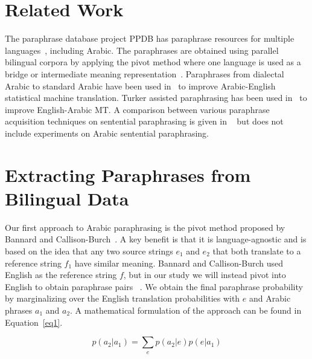 \documentclass[11pt,letterpaper]{article}
\begin{document}
\section{Related Work}
\label{related}
The paraphrase database project PPDB has paraphrase resources for multiple languages~\cite{bannard2005bilingual}, including Arabic. The paraphrases are obtained using parallel bilingual corpora  by applying the pivot method where one language is used as a bridge or intermediate meaning representation~\cite{bannard2005bilingual}. Paraphrases from dialectal Arabic to standard Arabic have been used in~\cite{Salloum:2011:DSA:2140533.2140535} to improve Arabic-English statistical machine translation. Turker assisted paraphrasing has been used in~\cite{turker} to improve English-Arabic MT. A comparison between various paraphrase acquisition techniques on sentential paraphrasing is given in ~\cite{Bouamor2010} but does not include experiments on Arabic sentential paraphrasing.

\section{Extracting Paraphrases from Bilingual Data}
\label{pb}
Our first approach to Arabic paraphrasing is the pivot method proposed by Bannard and Callison-Burch~\cite{bannard2005bilingual}. A key benefit is that it is language-agnostic and is based on the idea that any two source strings $e_1$ and $e_2$ that both translate to a reference string $f_1$ have similar meaning. Bannard and Callison-Burch used English as the reference string $f$, but in our study we will instead pivot into English to obtain paraphrase pairs~ \cite{bannard2005bilingual}. We obtain the final paraphrase probability by marginalizing over the English translation probabilities with $e$ and Arabic phrases $a_1$ and $a_2$. A mathematical formulation of the approach can be found in Equation~\ref{eq1}.

\begin{equation}
p(a_2 | a_1) = \sum_{e} p(a_2 | e) p(e | a_1)
\label{eq1}
\end{equation}
\end{document}
